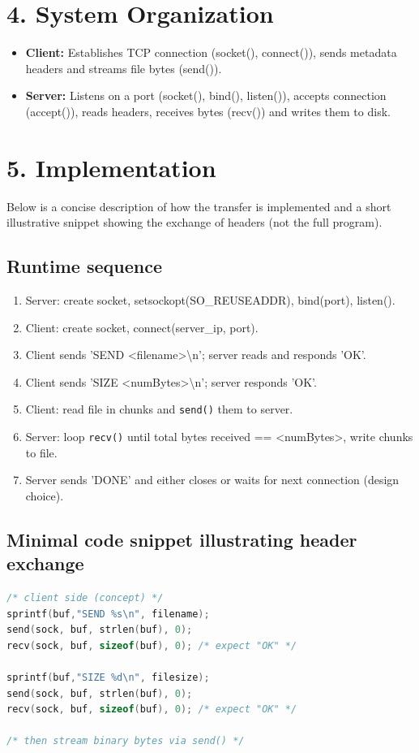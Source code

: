 \documentclass[11pt,a4paper]{article}
\begin{document}
\section*{4. System Organization}
\begin{itemize}
  \item \textbf{Client:} Establishes TCP connection (socket(), connect()),
    sends metadata headers and streams file bytes (send()).
  \item \textbf{Server:} Listens on a port (socket(), bind(), listen()),
    accepts connection (accept()), reads headers, receives bytes (recv())
    and writes them to disk.
\end{itemize}

\section*{5. Implementation}
Below is a concise description of how the transfer is implemented and a
short illustrative snippet showing the exchange of headers (not the full
program).

\subsection*{Runtime sequence}
\begin{enumerate}
  \item Server: create socket, setsockopt(SO\_REUSEADDR), bind(port), listen().
  \item Client: create socket, connect(server\_ip, port).
  \item Client sends 'SEND <filename>\textbackslash n'; server reads and responds 'OK'.
  \item Client sends 'SIZE <numBytes>\textbackslash n'; server responds 'OK'.
  \item Client: read file in chunks and \texttt{send()} them to server.
  \item Server: loop \texttt{recv()} until total bytes received == <numBytes>, write chunks to file.
  \item Server sends 'DONE' and either closes or waits for next connection (design choice).
\end{enumerate}

\subsection*{Minimal code snippet illustrating header exchange}
\begin{lstlisting}[language=C, basicstyle=\ttfamily\footnotesize]
/* client side (concept) */
sprintf(buf,"SEND %s\n", filename);
send(sock, buf, strlen(buf), 0);
recv(sock, buf, sizeof(buf), 0); /* expect "OK" */

sprintf(buf,"SIZE %d\n", filesize);
send(sock, buf, strlen(buf), 0);
recv(sock, buf, sizeof(buf), 0); /* expect "OK" */

/* then stream binary bytes via send() */
\end{lstlisting}
\end{document}
